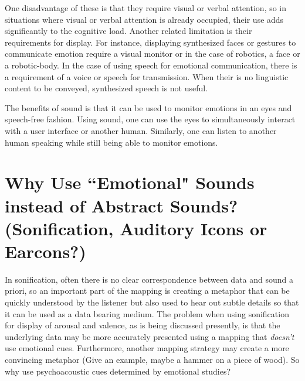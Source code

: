 One disadvantage of these is that they require visual or verbal attention, so in situations where visual or verbal attention is already occupied, their use adds significantly to the cognitive load.  Another related limitation is their requirements for display.  For instance, displaying synthesized faces or gestures to communicate emotion require a visual monitor or in the case of robotics, a face or a robotic-body.  In the case of using speech for emotional communication, there is a requirement of a voice or speech for transmission.  When their is no linguistic content to be conveyed, synthesized speech is not useful.

The benefits of sound is that it can be used to monitor emotions in an eyes and speech-free fashion.  Using sound, one can use the eyes to simultaneously interact with a user interface or another human.  Similarly, one can listen to another human speaking while still being able to monitor emotions. 

\section{Why Use ``Emotional" Sounds instead of Abstract Sounds? (Sonification, Auditory Icons or Earcons?)}

In sonification, often there is no clear correspondence between data and sound a priori, so an important part of the mapping is creating a metaphor that can be quickly understood by the listener but also used to hear out subtle details so that it can be used as a data bearing medium.  The problem when using sonification for display of arousal and valence, as is being discussed presently, is that the underlying data may be more accurately presented using a mapping that \textit{doesn't} use emotional cues.  Furthermore, another mapping strategy may create a more convincing metaphor  (Give an example, maybe a hammer on a piece of wood).  So why use psychoacoustic cues determined by emotional studies?

